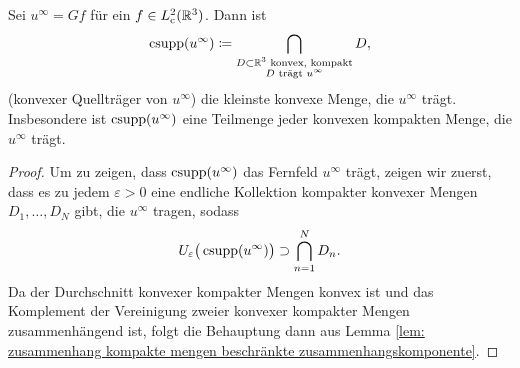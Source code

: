 \begin{satz}
	Sei \(u^\infty=Gf\) für ein \(f\in L_{\mathrm{c}}^2(\mathbb{R}^3)\). Dann ist
	\begin{equation}
		\label{konvexer quellträger von u^infty}
		\operatorname{csupp}(u^\infty)\coloneqq\bigcap_{\substack{D\subset\mathbb{R}^3\text{ konvex, kompakt}\\ D\text{ trägt }u^\infty}}D,
	\end{equation}
	(\glqq{}konvexer Quellträger von \(u^\infty\)\grqq{}) die kleinste konvexe Menge, die \(u^\infty\) trägt. Insbesondere ist \(\operatorname{csupp}(u^\infty)\) eine Teilmenge jeder konvexen kompakten Menge, die \(u^\infty\) trägt.
\end{satz}
\begin{proof}
	Um zu zeigen, dass \(\operatorname{csupp}(u^\infty)\) das Fernfeld \(u^\infty\) trägt, zeigen wir zuerst, dass es zu jedem \(\varepsilon>0\) eine endliche Kollektion kompakter konvexer Mengen \(D_1,\ldots,D_N\) gibt, die \(u^\infty\) tragen, sodass
	\begin{equation*}
		U_\varepsilon\big(\operatorname{csupp}(u^\infty)\big)\supset\bigcap_{n=1}^ND_n.
	\end{equation*}
	Da der Durchschnitt konvexer kompakter Mengen konvex ist und das Komplement der Vereinigung zweier konvexer kompakter Mengen zusammenhängend ist, folgt die Behauptung dann aus Lemma \ref{lem: zusammenhang kompakte mengen beschränkte zusammenhangskomponente}.\vspace{1mm}
	

\end{proof}
